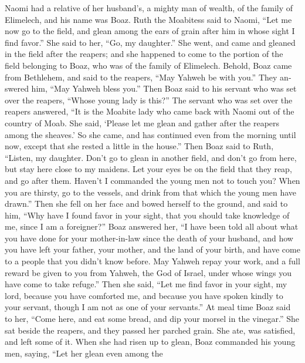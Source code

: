 \begin{paracol}{2}
\begin{otherlanguage}{english}
 Naomi had a relative of her husband's, a mighty man of
wealth, of the family of Elimelech, and his name was Boaz.
 Ruth the Moabitess said to Naomi, ``Let me now go to the
field, and glean among the ears of grain after him in whose sight I find
favor.'' She said to her, ``Go, my daughter.''  She went,
and came and gleaned in the field after the reapers; and she happened to
come to the portion of the field belonging to Boaz, who was of the
family of Elimelech.  Behold, Boaz came from Bethlehem,
and said to the reapers, ``May Yahweh be with you.'' They answered him,
``May Yahweh bless you.''  Then Boaz said to his servant
who was set over the reapers, ``Whose young lady is this?''
 The servant who was set over the reapers answered, ``It
is the Moabite lady who came back with Naomi out of the country of Moab.
 She said, `Please let me glean and gather after the
reapers among the sheaves.' So she came, and has continued even from the
morning until now, except that she rested a little in the house.''
 Then Boaz said to Ruth, ``Listen, my daughter. Don't go
to glean in another field, and don't go from here, but stay here close
to my maidens.  Let your eyes be on the field that they
reap, and go after them. Haven't I commanded the young men not to touch
you? When you are thirsty, go to the vessels, and drink from that which
the young men have drawn.''  Then she fell on her face
and bowed herself to the ground, and said to him, ``Why have I found
favor in your sight, that you should take knowledge of me, since I am a
foreigner?''  Boaz answered her, ``I have been told all
about what you have done for your mother-in-law since the death of your
husband, and how you have left your father, your mother, and the land of
your birth, and have come to a people that you didn't know before.
 May Yahweh repay your work, and a full reward be given
to you from Yahweh, the God of Israel, under whose wings you have come
to take refuge.''  Then she said, ``Let me find favor in
your sight, my lord, because you have comforted me, and because you have
spoken kindly to your servant, though I am not as one of your
servants.''  At meal time Boaz said to her, ``Come here,
and eat some bread, and dip your morsel in the vinegar.'' She sat beside
the reapers, and they passed her parched grain. She ate, was satisfied,
and left some of it.  When she had risen up to glean,
Boaz commanded his young men, saying, ``Let her glean even among the

\end{otherlanguage}
\end{paracol}
